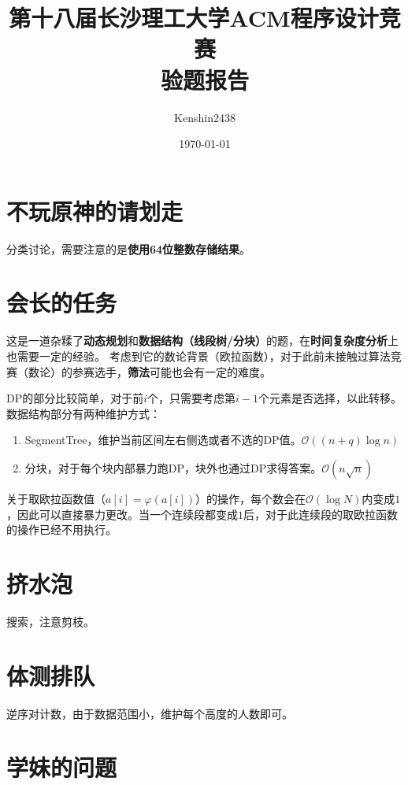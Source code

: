 \documentclass[12pt, UTF8]{ctexart}
\title{%
  第十八届长沙理工大学ACM程序设计竞赛\\
  \large 验题报告\\}
\author{Kenshin2438}
\date{\today}
\theoremstyle{mystyle}
\begin{document}
\maketitle
{}
\tableofcontents
\newpage

\section{不玩原神的请划走}

分类讨论，需要注意的是\textbf{使用64位整数存储结果}。

\section{会长的任务}
这是一道杂糅了\textbf{动态规划}和\textbf{数据结构（线段树/分块）}的题，在\textbf{时间复杂度分析}上也需要一定的经验。
考虑到它的数论背景（欧拉函数），对于此前未接触过算法竞赛（数论）的参赛选手，\textbf{筛法}可能也会有一定的难度。

DP的部分比较简单，对于前$i$个，只需要考虑第$i-1$个元素是否选择，以此转移。数据结构部分有两种维护方式：
\begin{enumerate}[noitemsep]
  \item SegmentTree，维护当前区间左右侧选或者不选的DP值。$\mathcal{O}((n+q)\log{n})$
  \item 分块，对于每个块内部暴力跑DP，块外也通过DP求得答案。$\mathcal{O}(n\sqrt{n})$
\end{enumerate}

关于取欧拉函数值（$a[i]=\varphi(a[i])$）的操作，每个数会在$\mathcal{O}(\log{N})$内变成$1$，因此可以直接暴力更改。当一个连续段都变成$1$后，对于此连续段的取欧拉函数的操作已经不用执行。

\section{挤水泡}

搜索，注意剪枝。

\section{体测排队}

逆序对计数，由于数据范围小，维护每个高度的人数即可。

\section{学妹的问题}
\end{document}
